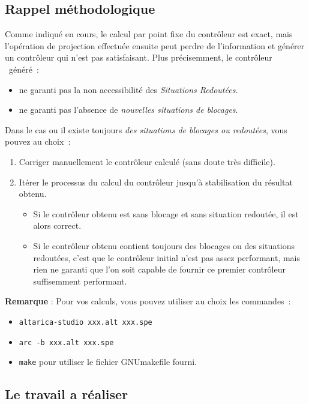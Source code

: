 \subsection{Rappel méthodologique}
Comme indiqué en cours, le calcul par point fixe du contrôleur est exact, mais l'opération de projection effectuée ensuite peut perdre de l'information et générer un contrôleur qui n'est pas satisfaisant. Plus précisemment, le contrôleur \altarica\ généré~:
\begin{itemize}
\item ne garanti pas la non accessibilité des \emph{Situations Redoutées}.
\item ne garanti pas l'absence de \emph{nouvelles situations de blocages}.
\end{itemize}

Dans le cas ou il existe toujours \emph{des situations de blocages ou redoutées}, vous pouvez au choix~:
\begin{enumerate}
\item Corriger manuellement le contrôleur calculé (sans doute très difficile).
\item Itérer le processus du calcul du contrôleur jusqu'à stabilisation du résultat obtenu. 
  \begin{itemize}
  \item Si le contrôleur obtenu est sans blocage et sans situation redoutée, il est alors correct.
  \item Si le contrôleur obtenu contient toujours des blocages ou des situations redoutées, c'est que le contrôleur initial n'est pas assez performant, mais rien ne garanti que l'on soit capable de fournir ce premier contrôleur suffisemment performant.
  \end{itemize}
\end{enumerate}

{\bf Remarque} : Pour vos calculs, vous pouvez utiliser au choix les commandes~:
\begin{itemize}
\item {\tt altarica-studio xxx.alt xxx.spe}
\item {\tt arc -b xxx.alt xxx.spe}
\item {\tt make} pour utiliser le fichier GNUmakefile fourni.
\end{itemize}

\subsection{Le travail a réaliser}

